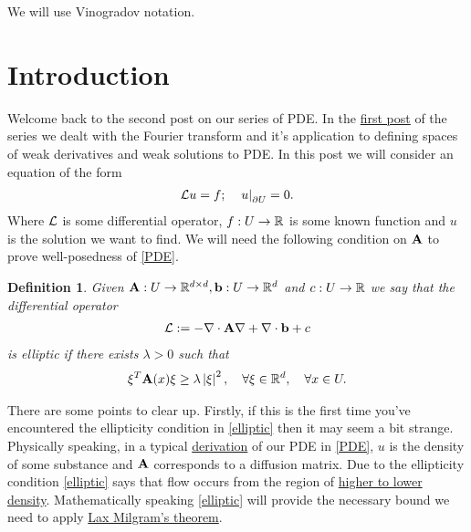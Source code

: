 \documentclass[12pt]{article}
\newtheorem{definition}[theorem]{Definition}
\theoremstyle{definition}
\newcommand\restr[2]{\left.#1\right|_{#2}}
\begin{document}
We will use Vinogradov notation.

\section{Introduction}
Welcome back to the second post on our series of PDE. In the \href{https://nowheredifferentiable.com/2023-01-29-PDE-1/}{first post} of the series we dealt with the Fourier transform and it's application to defining spaces of weak derivatives and weak solutions to PDE. In this post we will consider an equation of the form
\begin{align}\label{PDE}
  \Ll u =f; \quad \restr{u}{\partial U} =0.
\end{align}
Where $\mathcal{L}$ is some differential operator, $f: U \to  \mathbb{R}$  is some known function and $u$ is the solution we want to find. We will need the following condition on $\vb{A}$  to prove well-posedness of \eqref{PDE}.
\begin{definition}
  Given $\vb{A}: U \to \mathbb{R}^{d \times d}, \vb{b}: U \to \mathbb{R}^d$ and $c:U \to \mathbb{R}$ we say that the differential operator
  \begin{align}\label{operator}
    \mathcal{L}:= -\nabla \cdot \vb{A} \nabla + \nabla \cdot \vb{b} +c\end{align}
  is \emph{elliptic} if there exists $\lambda >0$ such that
  \begin{align}\label{elliptic}
    \xi ^T\vb{A}(x) \xi  \geq \lambda \left| \xi  \right|^2 , \quad\forall \xi \in \mathbb{R}^d , \quad\forall x \in U .
  \end{align}
\end{definition}
There are some points to clear up. Firstly, if this is the first time you've encountered  the ellipticity condition in \eqref{elliptic} then it may seem a bit strange.  Physically speaking, in a typical \href{https://nowheredifferentiable.com/2023-12-23-PDEs-4-Physical_derivation_of_parabolic_and_elliptic_PDE/}{derivation} of our PDE in \eqref{PDE}, $u$ is the density of some substance and $\vb{A}$ corresponds to a diffusion matrix. Due to the ellipticity condition \eqref{elliptic} says that flow occurs from the region of \href{https://nowheredifferentiable.com/2023-12-23-PDEs-4-Physical_derivation_of_parabolic_and_elliptic_PDE/#:~:text=a)-,Diffusion,-%3A%20This%20is%20the}{higher to lower density}. Mathematically speaking \eqref{elliptic} will provide the necessary bound we need to apply \href{https://nowheredifferentiable.com/2023-05-30-PDE-2-Hilbert/#:~:text=degenerate.%20As%20a-,particular,-example%2C%20a%20symmetric}{Lax Milgram's theorem}.
\end{document}

